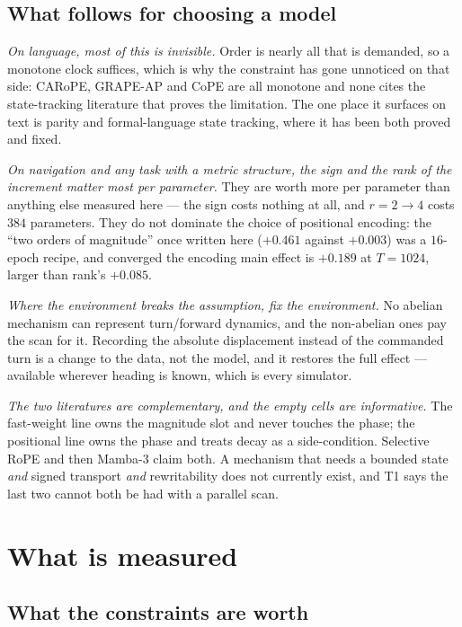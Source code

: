 \documentclass[11pt]{article}
\begin{document}
\subsection{What follows for choosing a model}

\emph{On language, most of this is invisible.} Order is nearly all that is demanded,
so a monotone clock suffices, which is why the constraint has gone unnoticed on that
side: CARoPE, GRAPE-AP and CoPE are all monotone and none cites the state-tracking
literature that proves the limitation. The one place it surfaces on text is parity
and formal-language state tracking, where it has been both proved and fixed.

\emph{On navigation and any task with a metric structure, the sign and the rank
of the increment matter most per parameter.} They are worth more per parameter
than anything else measured here --- the sign costs nothing at all, and $r=2\to4$
costs $384$ parameters. They do not dominate the choice of positional encoding: the
``two orders of magnitude'' once written here ($+0.461$ against $+0.003$) was a
$16$-epoch recipe, and converged the encoding main effect is $+0.189$ at
$T=1024$, larger than rank's $+0.085$.

\emph{Where the environment breaks the assumption, fix the environment.} No abelian
mechanism can represent turn/forward dynamics, and the non-abelian ones pay the scan
for it. Recording the absolute displacement instead of the commanded turn is a
change to the data, not the model, and it restores the full effect --- available
wherever heading is known, which is every simulator.

\emph{The two literatures are complementary, and the empty cells are informative.}
The fast-weight line owns the magnitude slot and never touches the phase; the
positional line owns the phase and treats decay as a side-condition. Selective RoPE
and then Mamba-3 claim both. A mechanism that needs a bounded state \emph{and}
signed transport \emph{and} rewritability does not currently exist, and T1 says the
last two cannot both be had with a parallel scan.

\section{What is measured}
\label{sec:measured}

\subsection{What the constraints are worth}
\end{document}
